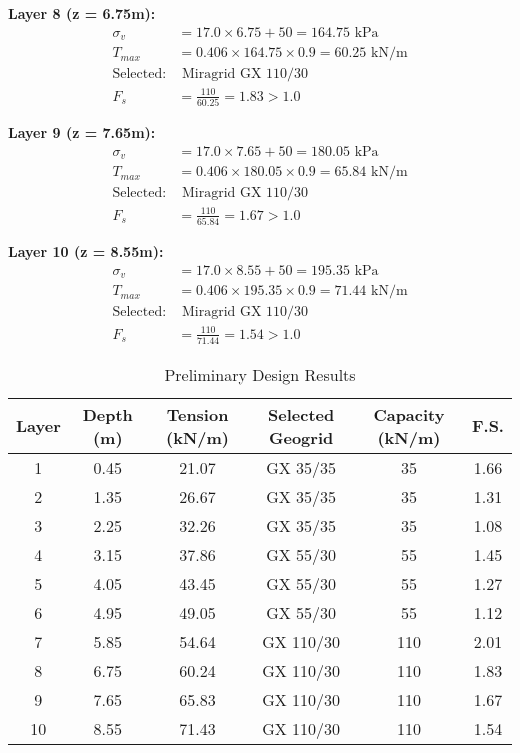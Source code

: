 \documentclass[10pt,a4paper,twocolumn]{article}
\begin{document}
\textbf{Layer 8 (z = 6.75m):}
\begin{align}
\sigma_v &= 17.0 \times 6.75 + 50 = 164.75 \text{ kPa} \\
T_{max} &= 0.406 \times 164.75 \times 0.9 = 60.25 \text{ kN/m} \\
\text{Selected:} &\text{ Miragrid GX 110/30} \\
F_s &= \frac{110}{60.25} = 1.83 > 1.0 
\end{align}

\textbf{Layer 9 (z = 7.65m):}
\begin{align}
\sigma_v &= 17.0 \times 7.65 + 50 = 180.05 \text{ kPa} \\
T_{max} &= 0.406 \times 180.05 \times 0.9 = 65.84 \text{ kN/m} \\
\text{Selected:} &\text{ Miragrid GX 110/30} \\
F_s &= \frac{110}{65.84} = 1.67 > 1.0 
\end{align}

\textbf{Layer 10 (z = 8.55m):}
\begin{align}
\sigma_v &= 17.0 \times 8.55 + 50 = 195.35 \text{ kPa} \\
T_{max} &= 0.406 \times 195.35 \times 0.9 = 71.44 \text{ kN/m} \\
\text{Selected:} &\text{ Miragrid GX 110/30} \\
F_s &= \frac{110}{71.44} = 1.54 > 1.0 
\end{align}

\begin{table}[H]
\centering
\caption{Preliminary Design Results}
\begin{tabular}{|c|c|c|c|c|c|}
\hline
\textbf{Layer} & \textbf{Depth (m)} & \textbf{Tension (kN/m)} & \textbf{Selected Geogrid} & \textbf{Capacity (kN/m)} & \textbf{F.S.} \\
\hline
1 & 0.45 & 21.07 & GX 35/35 & 35 & 1.66 \\
2 & 1.35 & 26.67 & GX 35/35 & 35 & 1.31 \\
3 & 2.25 & 32.26 & GX 35/35 & 35 & 1.08 \\
4 & 3.15 & 37.86 & GX 55/30 & 55 & 1.45 \\
5 & 4.05 & 43.45 & GX 55/30 & 55 & 1.27 \\
6 & 4.95 & 49.05 & GX 55/30 & 55 & 1.12 \\
7 & 5.85 & 54.64 & GX 110/30 & 110 & 2.01 \\
8 & 6.75 & 60.24 & GX 110/30 & 110 & 1.83 \\
9 & 7.65 & 65.83 & GX 110/30 & 110 & 1.67 \\
10 & 8.55 & 71.43 & GX 110/30 & 110 & 1.54 \\
\hline
\end{tabular}
\end{table}
\end{document}
